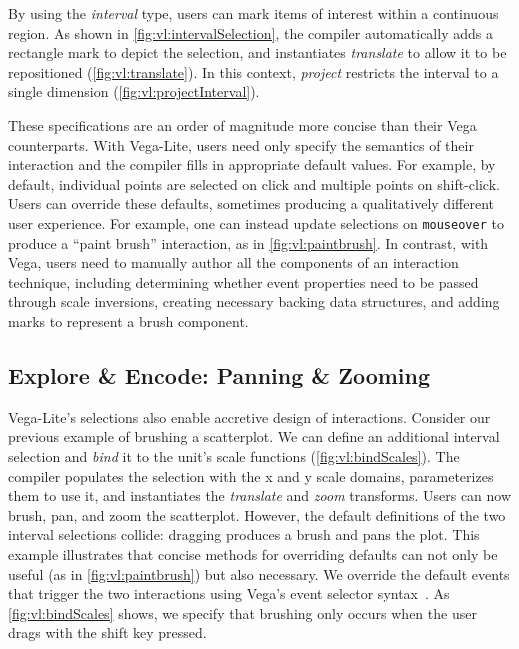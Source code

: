 By using the \emph{interval} type, users can mark items of interest within a
continuous region. As shown in \cref{fig:vl:intervalSelection}, the compiler
automatically adds a rectangle mark to depict the selection, and instantiates
\emph{translate} to allow it to be repositioned (\cref{fig:vl:translate}). In this
context, \emph{project} restricts the interval to a single dimension
(\cref{fig:vl:projectInterval}).

These specifications are an order of magnitude more concise than their Vega
counterparts. With Vega-Lite, users need only specify the semantics of their
interaction and the compiler fills in appropriate default values. For example,
by default, individual points are selected on click and multiple points on
shift-click. Users can override these defaults, sometimes producing a
qualitatively different user experience. For example, one can instead update
selections on \texttt{mouseover} to produce a ``paint brush'' interaction, as in
\cref{fig:vl:paintbrush}. In contrast, with Vega, users need to manually author all
the components of an interaction technique, including determining whether event
properties need to be passed through scale inversions, creating necessary
backing data structures, and adding marks to represent a brush component.

\subsection{Explore \& Encode: Panning \& Zooming}
\label{sec:vl:panzoom}

Vega-Lite's selections also enable accretive design of interactions. Consider
our previous example of brushing a scatterplot. We can define an additional
interval selection and \emph{bind} it to the unit's scale functions
(\cref{fig:vl:bindScales}). The compiler populates the selection with the x and y
scale domains, parameterizes them to use it, and instantiates the
\emph{translate} and \emph{zoom} transforms. Users can now brush, pan, and zoom
the scatterplot. However, the default definitions of the two interval selections
collide: dragging produces a brush and pans the plot. This example illustrates
that concise methods for overriding defaults can not only be useful (as in
\cref{fig:vl:paintbrush}) but also necessary. We override the default events that
trigger the two interactions using Vega's event selector
syntax~\cite{reactive-vega-model}. As \cref{fig:vl:bindScales} shows, we specify
that brushing only occurs when the user drags with the shift key pressed.

